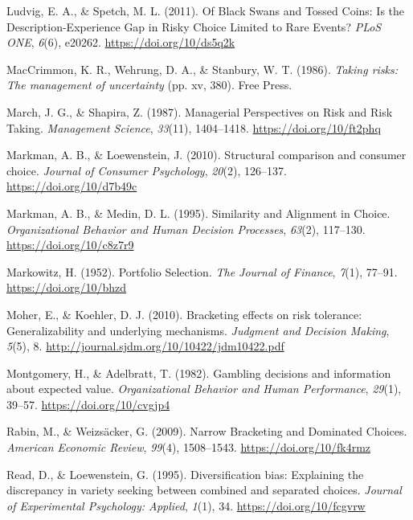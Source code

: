 \documentclass[
  english,
  man, donotrepeattitle,floatsintext]{apa7}
\newlength{\cslhangindent}
\newenvironment{cslreferences}%
  {\setlength{\parindent}{0pt}%
  \everypar{\setlength{\hangindent}{\cslhangindent}}\ignorespaces}%
  {\par}
\theoremstyle{definition}
\theoremstyle{definition}
\theoremstyle{definition}
\theoremstyle{definition}
\theoremstyle{remark}
\begin{document}
\begin{cslreferences}
\leavevmode\hypertarget{ref-ludvig2011}{}%
Ludvig, E. A., \& Spetch, M. L. (2011). Of Black Swans and Tossed Coins: Is the Description-Experience Gap in Risky Choice Limited to Rare Events? \emph{PLoS ONE}, \emph{6}(6), e20262. \url{https://doi.org/10/ds5q2k}

\leavevmode\hypertarget{ref-maccrimmon1986}{}%
MacCrimmon, K. R., Wehrung, D. A., \& Stanbury, W. T. (1986). \emph{Taking risks: The management of uncertainty} (pp. xv, 380). Free Press.

\leavevmode\hypertarget{ref-march1987}{}%
March, J. G., \& Shapira, Z. (1987). Managerial Perspectives on Risk and Risk Taking. \emph{Management Science}, \emph{33}(11), 1404--1418. \url{https://doi.org/10/ft2phq}

\leavevmode\hypertarget{ref-markman2010}{}%
Markman, A. B., \& Loewenstein, J. (2010). Structural comparison and consumer choice. \emph{Journal of Consumer Psychology}, \emph{20}(2), 126--137. \url{https://doi.org/10/d7b49c}

\leavevmode\hypertarget{ref-markman1995}{}%
Markman, A. B., \& Medin, D. L. (1995). Similarity and Alignment in Choice. \emph{Organizational Behavior and Human Decision Processes}, \emph{63}(2), 117--130. \url{https://doi.org/10/c8z7r9}

\leavevmode\hypertarget{ref-markowitz1952}{}%
Markowitz, H. (1952). Portfolio Selection. \emph{The Journal of Finance}, \emph{7}(1), 77--91. \url{https://doi.org/10/bhzd}

\leavevmode\hypertarget{ref-moher2010}{}%
Moher, E., \& Koehler, D. J. (2010). Bracketing effects on risk tolerance: Generalizability and underlying mechanisms. \emph{Judgment and Decision Making}, \emph{5}(5), 8. \url{http://journal.sjdm.org/10/10422/jdm10422.pdf}

\leavevmode\hypertarget{ref-montgomery1982}{}%
Montgomery, H., \& Adelbratt, T. (1982). Gambling decisions and information about expected value. \emph{Organizational Behavior and Human Performance}, \emph{29}(1), 39--57. \url{https://doi.org/10/cvgjp4}

\leavevmode\hypertarget{ref-rabin2009}{}%
Rabin, M., \& Weizsäcker, G. (2009). Narrow Bracketing and Dominated Choices. \emph{American Economic Review}, \emph{99}(4), 1508--1543. \url{https://doi.org/10/fk4rmz}

\leavevmode\hypertarget{ref-read1995}{}%
Read, D., \& Loewenstein, G. (1995). Diversification bias: Explaining the discrepancy in variety seeking between combined and separated choices. \emph{Journal of Experimental Psychology: Applied}, \emph{1}(1), 34. \url{https://doi.org/10/fcgvrw}


\end{cslreferences}
\end{document}
